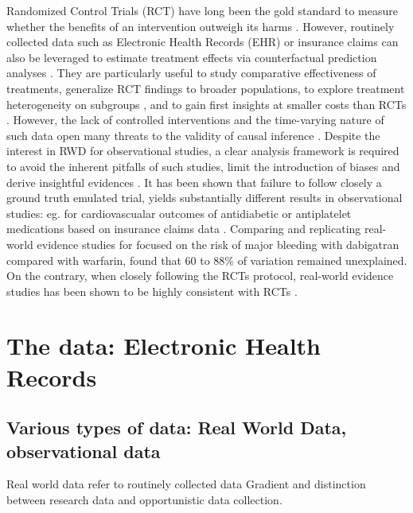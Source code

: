 \documentclass{report}
\begin{document}
%
Randomized Control Trials (RCT) have
long been the gold standard to measure whether the benefits of an intervention
outweigh its harms \citep{brook1986method}. However, routinely collected data
such as Electronic Health Records (EHR) or insurance claims
\citep{wang2023early} can also be leveraged to estimate treatment effects via
counterfactual prediction analyses \citep{hernan2019second}.  They are
particularly useful to study comparative effectiveness of treatments,
generalize RCT findings to broader populations, to explore treatment
heterogeneity on subgroups \citep{mant1999can,desai2021broadening}, and to
gain first insights at smaller costs than RCTs
\citep{black1996we,bosdriesz2020evidence}. However, the lack of controlled
interventions and the time-varying nature of such data open many threats to
the validity of causal inference \citep{bouvier2023should}.
Despite the interest in RWD for observational studies, a clear analysis
framework is required to avoid the inherent pitfalls of such studies, limit the
introduction of biases and derive insightful evidences \citep{hernan2019second,
  wang2023emulation}. It has been shown that failure to follow closely a ground
truth emulated trial,
yields substantially different results in observational studies: eg. for
cardiovascualar outcomes of antidiabetic or antiplatelet medications based on
insurance claims data \citep{schneeweiss2021conducting}. Comparing and
replicating real-world evidence studies for focused on the risk of major
bleeding
with dabigatran compared with warfarin, \cite{wang2022understanding} found that
60 to 88\% of variation remained unexplained. On the contrary, when closely
following the RCTs protocol, real-world evidence studies has been shown to be
highly consistent with RCTs \citep{wang2023emulation}.



\section{The data: Electronic Health Records}\label{sec:intro:data}

\subsection{Various types of data: Real World Data, observational data}\label{subsec:intro:real_world_data}

Real world data refer to routinely collected data
Gradient and distinction between research data and opportunistic data collection.
\end{document}
